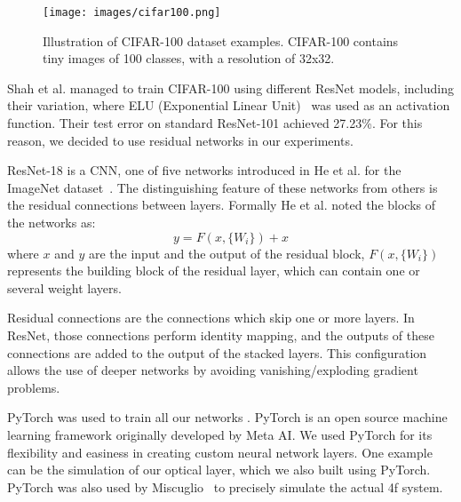 \documentclass{article}
\begin{document}
\begin{figure}[h]
    \centering
    \texttt{[image: images/cifar100.png]}
    \caption{Illustration of CIFAR-100 dataset examples. CIFAR-100 contains tiny images of 100 classes, with a resolution of 32x32.}
    \label{fig:cifar100}
\end{figure}

Shah et al. \cite{shah_deep_2016} managed to train CIFAR-100 using different ResNet models, including their variation, where ELU (Exponential Linear Unit)~\cite{clevert_fast_2016} was used as an activation function. Their test error on standard ResNet-101 achieved 27.23\%. For this reason, we decided to use residual networks in our experiments.

ResNet-18 is a CNN, one of five networks introduced in He et al. \cite{he_deep_2016} for the ImageNet dataset~\cite{deng_imagenet_2009}. The distinguishing feature of these networks from others is the residual connections between layers. Formally He et al.\cite{he_deep_2016} noted the blocks of the networks as:
\begin{equation}
    y = F(x,\{W_i\})+x
\end{equation}
where $x$ and $y$ are the input and the output of the residual block, $F(x,\{W_i\})$ represents the building block of the residual layer, which can contain one or several weight layers. 

Residual connections are the connections which skip one or more layers. In ResNet, those connections perform identity mapping, and the outputs of these connections are added to the output of the stacked layers. This configuration allows the use of deeper networks by avoiding vanishing/exploding gradient problems. 

PyTorch was used to train all our networks \cite{paszke_pytorch_2019}. PyTorch is an open source machine learning framework originally developed by Meta AI. We used PyTorch for its flexibility and easiness in creating custom neural network layers. One example can be the simulation of our optical layer, which we also built using PyTorch. PyTorch was also used by Miscuglio~\cite{miscuglio_massively_2020} to precisely simulate the actual 4f system.  
\end{document}
